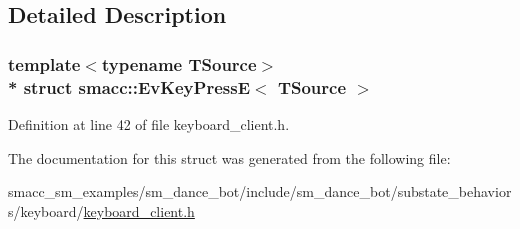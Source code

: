\subsection{Detailed Description}
\subsubsection*{template$<$typename T\+Source$>$\\*
struct smacc\+::\+Ev\+Key\+Press\+E$<$ T\+Source $>$}



Definition at line 42 of file keyboard\+\_\+client.\+h.



The documentation for this struct was generated from the following file\+:\begin{DoxyCompactItemize}
\item 
smacc\+\_\+sm\+\_\+examples/sm\+\_\+dance\+\_\+bot/include/sm\+\_\+dance\+\_\+bot/substate\+\_\+behaviors/keyboard/\hyperlink{keyboard__client_8h}{keyboard\+\_\+client.\+h}\end{DoxyCompactItemize}
